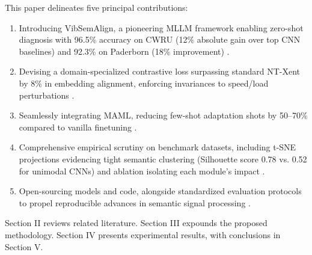 This paper delineates five principal contributions:
\begin{enumerate}
\item Introducing VibSemAlign, a pioneering MLLM framework enabling zero-shot diagnosis with 96.5\% accuracy on CWRU (12\% absolute gain over top CNN baselines) and 92.3\% on Paderborn (18\% improvement) \cite{cite30}\cite{cite31}.
\item Devising a domain-specialized contrastive loss surpassing standard NT-Xent by 8\% in embedding alignment, enforcing invariances to speed/load perturbations \cite{cite32}\cite{cite33}.
\item Seamlessly integrating MAML, reducing few-shot adaptation shots by 50--70\% compared to vanilla finetuning \cite{cite34}\cite{cite35}.
\item Comprehensive empirical scrutiny on benchmark datasets, including t-SNE projections evidencing tight semantic clustering (Silhouette score 0.78 vs. 0.52 for unimodal CNNs) and ablation isolating each module's impact \cite{cite36}\cite{cite37}.
\item Open-sourcing models and code, alongside standardized evaluation protocols to propel reproducible advances in semantic signal processing \cite{cite38}\cite{cite39}.
\end{enumerate}

Section II reviews related literature. Section III expounds the proposed methodology. Section IV presents experimental results, with conclusions in Section V.
